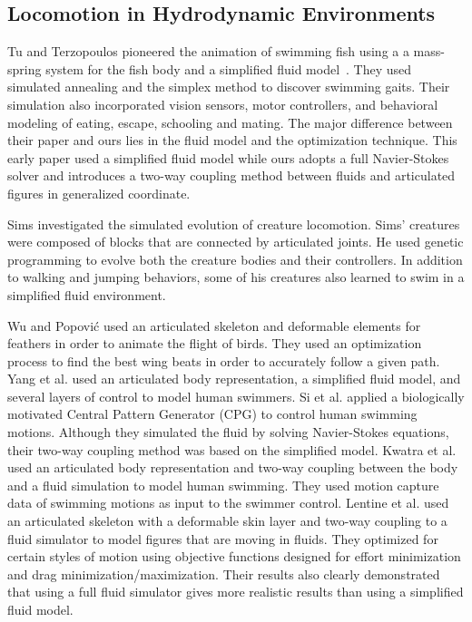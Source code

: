\subsection{Locomotion in Hydrodynamic Environments}

Tu and Terzopoulos pioneered the animation of swimming fish using a a
mass-spring system for the fish body and a simplified fluid
model~\cite{tu1994artificial,terzopoulos1994artificial,Grzeszczuk95automatedlearning}. They used simulated annealing and the simplex method to discover swimming gaits. Their simulation also incorporated vision sensors, motor controllers, and behavioral modeling
of eating, escape, schooling and mating.  The
major difference between their paper and ours lies in the fluid model and the optimization technique. This early paper used a
simplified fluid model while ours adopts a full Navier-Stokes solver and introduces a two-way coupling method between
fluids and articulated figures in generalized coordinate.

Sims \cite{sims1994creatures} investigated the simulated evolution of
creature locomotion.  Sims' creatures were composed
of blocks that are connected by articulated joints. He used genetic
programming to evolve both the creature bodies and their controllers.  In
addition to walking and jumping behaviors, some of his creatures also
learned to swim in a simplified fluid environment.

Wu and Popovi\'{c} \cite{Wu:2003} used an articulated skeleton and deformable elements for
feathers in order to animate the flight of birds.
They used an optimization process to find the best wing beats in order to
accurately follow a given path.  Yang et al. \cite{yang2004layered} used an articulated body
representation, a simplified fluid model, and several layers of control to
model human swimmers. Si et al. \cite{Si:2014} applied a biologically motivated Central Pattern Generator (CPG) to control human swimming motions. Although they simulated the fluid by solving Navier-Stokes equations, their two-way coupling method was based on the simplified model. Kwatra et al. \cite{kwatra2009fluid} used an
articulated body representation and two-way coupling between the body and a
fluid simulation to model human swimming.  They used
motion capture data of swimming motions as input to the swimmer control.
Lentine et al. \cite{lentine2010creature} used an articulated skeleton with a deformable skin layer and
two-way coupling to a fluid simulator to model figures that are moving in
fluids.  They optimized for certain styles of
motion using objective functions designed for effort minimization and drag
minimization/maximization.  Their results also clearly demonstrated that
using a full fluid simulator gives more realistic results than using a
simplified fluid model.

